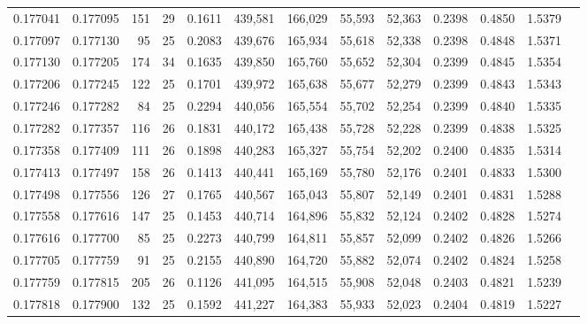 \begin{tabular}{rrrrrrrrrrrrr}
0.177041 & 0.177095 & 151 &  29 &                                     0.1611 & 439,581 & 166,029 &  55,593 &  52,363 & 0.2398 & 0.4850 & 1.5379 \\
0.177097 & 0.177130 &  95 &  25 &                                     0.2083 & 439,676 & 165,934 &  55,618 &  52,338 & 0.2398 & 0.4848 & 1.5371 \\
0.177130 & 0.177205 & 174 &  34 &                                     0.1635 & 439,850 & 165,760 &  55,652 &  52,304 & 0.2399 & 0.4845 & 1.5354 \\
0.177206 & 0.177245 & 122 &  25 &                                     0.1701 & 439,972 & 165,638 &  55,677 &  52,279 & 0.2399 & 0.4843 & 1.5343 \\
0.177246 & 0.177282 &  84 &  25 &                                     0.2294 & 440,056 & 165,554 &  55,702 &  52,254 & 0.2399 & 0.4840 & 1.5335 \\
0.177282 & 0.177357 & 116 &  26 &                                     0.1831 & 440,172 & 165,438 &  55,728 &  52,228 & 0.2399 & 0.4838 & 1.5325 \\
0.177358 & 0.177409 & 111 &  26 &                                     0.1898 & 440,283 & 165,327 &  55,754 &  52,202 & 0.2400 & 0.4835 & 1.5314 \\
0.177413 & 0.177497 & 158 &  26 &                                     0.1413 & 440,441 & 165,169 &  55,780 &  52,176 & 0.2401 & 0.4833 & 1.5300 \\
0.177498 & 0.177556 & 126 &  27 &                                     0.1765 & 440,567 & 165,043 &  55,807 &  52,149 & 0.2401 & 0.4831 & 1.5288 \\
0.177558 & 0.177616 & 147 &  25 &                                     0.1453 & 440,714 & 164,896 &  55,832 &  52,124 & 0.2402 & 0.4828 & 1.5274 \\
0.177616 & 0.177700 &  85 &  25 &                                     0.2273 & 440,799 & 164,811 &  55,857 &  52,099 & 0.2402 & 0.4826 & 1.5266 \\
0.177705 & 0.177759 &  91 &  25 &                                     0.2155 & 440,890 & 164,720 &  55,882 &  52,074 & 0.2402 & 0.4824 & 1.5258 \\
0.177759 & 0.177815 & 205 &  26 &                                     0.1126 & 441,095 & 164,515 &  55,908 &  52,048 & 0.2403 & 0.4821 & 1.5239 \\
0.177818 & 0.177900 & 132 &  25 &                                     0.1592 & 441,227 & 164,383 &  55,933 &  52,023 & 0.2404 & 0.4819 & 1.5227 \\

\end{tabular}
